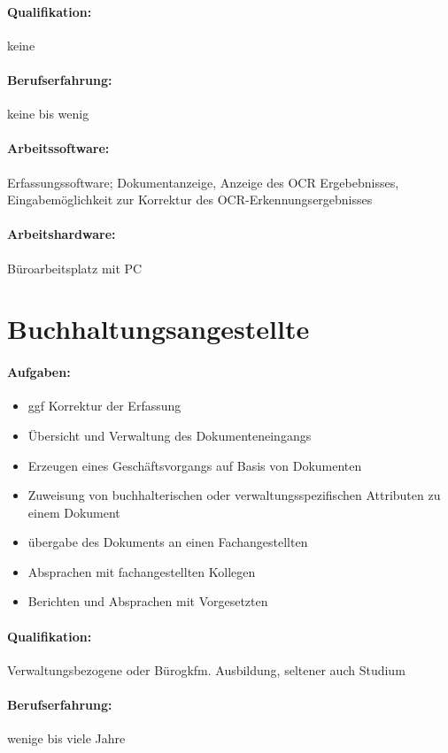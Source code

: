 \documentclass[11pt,oneside,a4paper,notitlepage]{article}
\begin{document}
\paragraph*{Qualifikation: } keine
%
\paragraph*{Berufserfahrung: } keine bis wenig
%
\paragraph*{Arbeitssoftware: } Erfassungssoftware; Dokumentanzeige, Anzeige des OCR Ergebebnisses, Eingabemöglichkeit zur
Korrektur des OCR-Erkennungsergebnisses
%
\paragraph*{Arbeitshardware: } Büroarbeitsplatz mit PC


%
%
\section{Buchhaltungsangestellte}
%
\paragraph*{Aufgaben: }
\begin{itemize}
\item ggf Korrektur der Erfassung
\item Übersicht und Verwaltung des Dokumenteneingangs
\item Erzeugen eines Geschäftsvorgangs auf Basis von Dokumenten
\item Zuweisung von buchhalterischen oder verwaltungsspezifischen Attributen zu einem Dokument
\item übergabe des Dokuments an einen Fachangestellten
\item Absprachen mit fachangestellten Kollegen
\item Berichten und Absprachen mit Vorgesetzten
\end{itemize}
\noindent

\paragraph*{Qualifikation: } Verwaltungsbezogene oder Bürogkfm. Ausbildung, seltener auch Studium
%
\paragraph*{Berufserfahrung: } wenige bis viele Jahre
%
\end{document}
